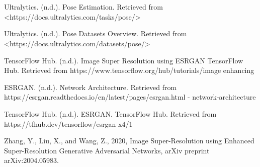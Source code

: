 \documentclass[12pt]{article}
\begin{document}
\section{}

\pagebreak

\section{}
\printbibliography[heading=none]
\begin{thebibliography}{9}

Ultralytics. (n.d.). Pose Estimation. Retrieved from <https://docs.ultralytics.com/tasks/pose/>

Ultralytics. (n.d.). Pose Datasets Overview. Retrieved from <https://docs.ultralytics.com/datasets/pose/>

TensorFlow Hub. (n.d.). Image Super Resolution using ESRGAN TensorFlow Hub. Retrieved from https://www.tensorflow.org/hub/tutorials/image enhancing

ESRGAN. (n.d.). Network Architecture. Retrieved from https://esrgan.readthedocs.io/en/latest/pages/esrgan.html - network-architecture

TensorFlow Hub. (n.d.). ESRGAN. TensorFlow Hub. Retrieved from https://tfhub.dev/tensorflow/esrgan x4/1

Zhang, Y., Liu, X., and Wang, Z., 2020, Image Super-Resolution using Enhanced Super-Resolution Generative Adversarial Networks, arXiv preprint arXiv:2004.05983.
\end{thebibliography}
\end{document}
